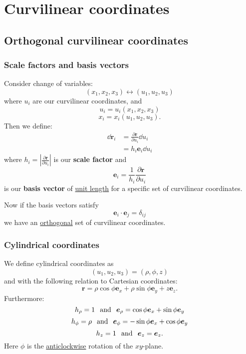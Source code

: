 \documentclass{article}
\begin{document}
\newpage

\section{Curvilinear coordinates}

\subsection{Orthogonal curvilinear coordinates}

\subsubsection{Scale factors and basis vectors}
Consider change of variables:
$$(x_1,x_2,x_3)\leftrightarrow(u_1,u_2,u_3)$$
where $u_i$ are our curvilinear coordinates, and
$$u_i=u_i(x_1,x_2,x_3)$$
$$x_i=x_i(u_1,u_2,u_3).$$
Then we define:
\begin{align*}
    \dd\boldsymbol{r}_i
    &=\frac{\partial\boldsymbol{r}}{\partial u_i}\dd u_i \\
    &=h_i\boldsymbol{e}_i \dd u_i
\end{align*}
where $h_i=|\displaystyle\frac{\partial\boldsymbol{r}}{\partial u_i}|$ is our \textbf{scale factor} and 
$$\boldsymbol{e}_i=\frac{1}{h_i}\frac{\partial\boldsymbol{r}}{\partial u_i}$$
is our \textbf{basis vector} of \underline{unit length} for a specific set of curvilinear coordinates.

Now if the basis vectors satisfy
$$\boldsymbol{e}_i\cdot\boldsymbol{e}_j=\delta_{ij}$$
we have an \underline{orthogonal} set of curvilinear coordinates.

\subsubsection{Cylindrical coordinates}
We define cylindrical coordinates as
$$(u_1,u_2,u_3)=(\rho,\phi,z)$$
and with the following relation to Cartesian coordinates:
$$\boldsymbol{r}=\rho\cos\phi\boldsymbol{e}_x
+\rho\sin\phi\boldsymbol{e}_y+z\boldsymbol{e}_z.$$
Furthermore:
$$h_{\rho}=1\hspace{0.1in}\text{and}\hspace{0.1in}\boldsymbol{e}_{\rho}=\cos\phi\boldsymbol{e}_{x}
+\sin\phi\boldsymbol{e}_{y}$$
$$h_{\phi}=\rho\hspace{0.1in}\text{and}\hspace{0.1in}
\boldsymbol{e}_{\phi}=-\sin\phi\boldsymbol{e}_x+\cos\phi\boldsymbol{e}_y$$
$$h_{z}=1\hspace{0.1in}\text{and}\hspace{0.1in}\boldsymbol{e}_z=\boldsymbol{e}_z.$$
Here $\phi$ is the \underline{anticlockwise} rotation of the $xy$-plane.
\end{document}
